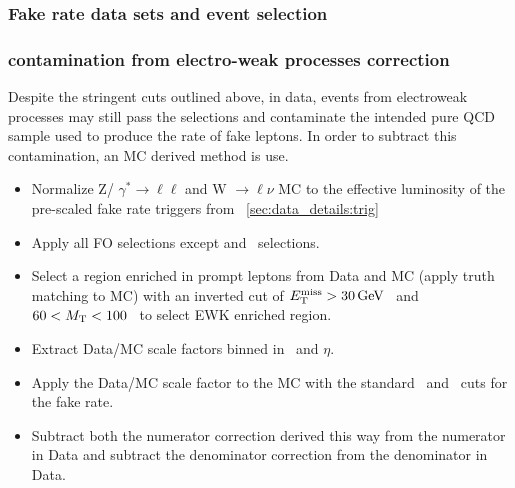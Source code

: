         		\subsubsection{Fake rate data sets and event selection}
		
		
		
		
		
		
		
		
		
        		\subsubsection{contamination from electro-weak processes correction}
		
		Despite the stringent cuts outlined above, in data, events from electroweak processes may still pass the selections and contaminate the intended pure QCD sample used to produce the rate of fake leptons. In order to subtract this contamination, an MC derived method is use.
\begin{itemize}
\item Normalize Z/ $\gamma ^{*} \rightarrow \ell \ell$ and W $\rightarrow \ell \nu$ MC to  the effective luminosity of the pre-scaled fake rate triggers from ~\ref{sec:data_details:trig} 
\item Apply all FO selections except \MET and \Mt \ selections.
\item Select a region enriched in prompt leptons from Data and MC (apply truth matching to MC) with an inverted cut of $E_{\mathrm{T}}^{\text{miss}} > 30 \,\text{Ge\hspace{-.08em}V}$ \ and $60 < M_{\mathrm{T}} < 100$ \ to select EWK enriched region.
\item Extract Data/MC scale factors binned in \pt \ and $\eta$.
\item Apply the Data/MC scale factor to the MC with the standard \MET \ and \Mt \ cuts for the fake rate.
\item Subtract both the numerator correction derived this way from the numerator in Data and subtract the denominator correction from the denominator in Data.
\end{itemize}
		
		
